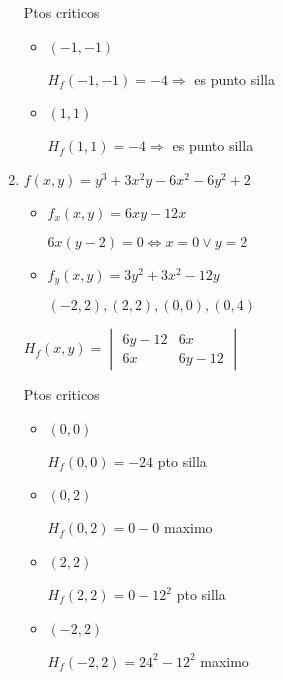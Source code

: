 \documentclass[../practica_06.tex]{subfiles}
\begin{document}
\begin{enumerate}
            Ptos criticos \begin{itemize}
                \item $(-1,-1)$
                
                    $H_f(-1,-1) = -4 \Rightarrow$ es punto silla 
                    
                \item $(1,1)$

                    $H_f(1,1) = -4 \Rightarrow$ es punto silla 
            \end{itemize}

        \item $f(x,y) = y^3 + 3x^2y - 6x^2 - 6y^2 + 2$
        
            \begin{itemize}
                \item $f_x(x,y) = 6xy - 12x$
                
                    $ 6x(y-2) = 0 \Leftrightarrow x = 0 \vee y = 2$

                \item $f_y(x,y) = 3y^2 + 3x^2 - 12y$

                    $(-2,2),(2,2),(0,0),(0,4)$

            \end{itemize}

            $H_f(x,y) = \begin{vmatrix}
                6y - 12 & 6x \\
                6x & 6y - 12
            \end{vmatrix}$

            Ptos criticos\begin{itemize}
                \item $(0,0)$
                
                    $H_f(0,0) = -24$ pto silla

                \item $(0,2)$
                
                    $H_f(0,2) = 0 - 0$ maximo 

                \item $(2,2)$
                
                    $H_f(2,2) = 0 - 12^2$ pto silla

                \item $(-2,2)$
                
                    $H_f(-2,2) = 24^2 - 12^2$ maximo


\end{itemize}
\end{enumerate}
\end{document}
